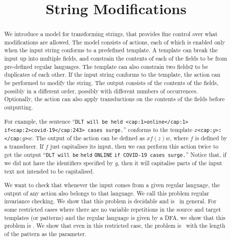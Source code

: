 \documentclass[12pt, a4paper]{article}
\title{String Modifications}
\author{}
\date{}
\begin{document}
\maketitle



\begin{abstract}
	We introduce a model for transforming strings, that provides fine control over what modifications are allowed. The model consists of actions, each of which is enabled only when the input string conforms to a predefined template. A template can break the input up into multiple fields, and constrain the contents of each of the fields to be from pre-defined regular languages. The template can also constrain two fields2 to be duplicates of each other. If the input string conforms to the template, the action can be performed to modify the string. The output consists of the contents of the fields, possibly in a different order, possibly with different numbers of occurrences. Optionally, the action can also apply transductions on the contents of the fields before outputting.

	For example, the sentence ``\verb|DLT will be held <cap:1>online</cap:1>| \verb|if|\verb|<cap:2>covid-19</cap:243> cases surge.|'' conforms to the template \texttt{$x$<cap:$y$>$z$</cap:$y$>$w$}. The output of the action can be defined as $xf(z)w$, where $f$ is defined by a transducer. If $f$ just capitalises its input, then we can perform this action twice to get the output ``\verb|DLT will be| \verb|held|  \verb|ONLINE| \verb|if COVID-19 cases surge.|'' Notice that, if we did not have the identifiers specified by $y$, then it will capitalise parts of the input text not intended to be capitalised.

	We want to check that whenever the input comes from a given regular language, the output of any action also belongs to that language. We call this problem regular invariance checking. We show that this problem is decidable and is \pspc\ in general. For some restricted cases where there are no variable repetitions in the source and target templates (or patterns) and the regular language is given by a DFA, we show that this problem is \conpc. We show that even in this restricted case, the problem is \woneh\ with the length of the pattern as the parameter.
\end{abstract}
\end{document}
